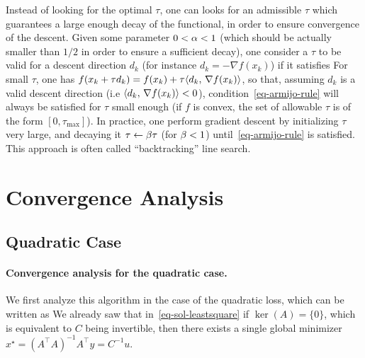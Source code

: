\begin{rem}
	Instead of looking for the optimal $\tau$, one can looks for an admissible $\tau$ which guarantees a large enough decay of the functional, in order to ensure convergence of the descent. 
	Given some parameter $0<\alpha<1$ (which should be actually smaller than $1/2$ in order to ensure a sufficient decay), one consider a $\tau$ to be valid for a descent direction $d_k$ (for instance $d_k=-\nabla f(x_k)$) if it satisfies
	For small $\tau$, one has $f(x_k+\tau d_k) = f(x_k) + \tau \langle d_k,\,\nabla f(x_k)\rangle$, so that, assuming $d_k$ is a valid descent direction (i.e $\langle d_k,\,\nabla f(x_k)\rangle<0$),  condition~\eqref{eq-armijo-rule} will always be satisfied for $\tau$ small enough (if $f$ is convex, the set of allowable $\tau$ is of the form $[0,\tau_{\max}]$). 
	In practice, one perform gradient descent by initializing $\tau$ very large, and decaying it $\tau \leftarrow \beta \tau$ (for $\beta < 1$) until~\eqref{eq-armijo-rule} is satisfied. 
	This approach is often called ``backtracking'' line search. 
\end{rem}



\section{Convergence Analysis}


\subsection{Quadratic Case}

\paragraph{Convergence analysis for the quadratic case.}

We first analyze this algorithm in the case of the quadratic loss, which can be written as
We already saw that in~\eqref{eq-sol-leastsquare} if $\ker(A)=\{0\}$, which is equivalent to $C$ being invertible, then there exists a single global minimizer $x^\star = (A^\top A)^{-1} A^\top y = C^{-1} u$. 

